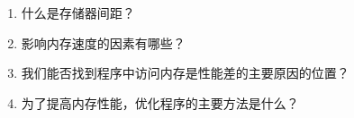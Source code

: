 \begin{enumerate}
\item 什么是存储器间距？
\item 影响内存速度的因素有哪些？
\item 我们能否找到程序中访问内存是性能差的主要原因的位置？
\item 为了提高内存性能，优化程序的主要方法是什么？
\end{enumerate}